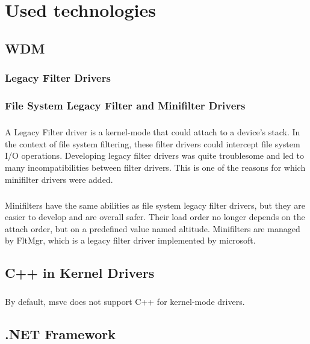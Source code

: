 \chapter{Used technologies}
    \section{WDM}
        \subsection{Legacy Filter Drivers}
        \subsection{File System Legacy Filter and Minifilter Drivers}
            \paragraph{}
            A Legacy Filter driver is a kernel-mode that could attach to a device's stack. In the context of file system filtering, these
            filter drivers could intercept file system I/O operations. Developing legacy filter drivers was quite troublesome and led to 
            many incompatibilities between filter drivers. This is one of the reasons for which minifilter drivers were added.
            \paragraph{}
            Minifilters have the same abilities as file system legacy filter drivers, but they are easier to develop and are overall safer. Their
            load order no longer depends on the attach order, but on a predefined value named altitude. Minifilters are managed by FltMgr, which is
            a legacy filter driver implemented by microsoft.
    \section{C++ in Kernel Drivers}
        \paragraph{}
        By default, msvc does not support C++ for kernel-mode drivers.
        \paragraph{}
    \section{.NET Framework}
